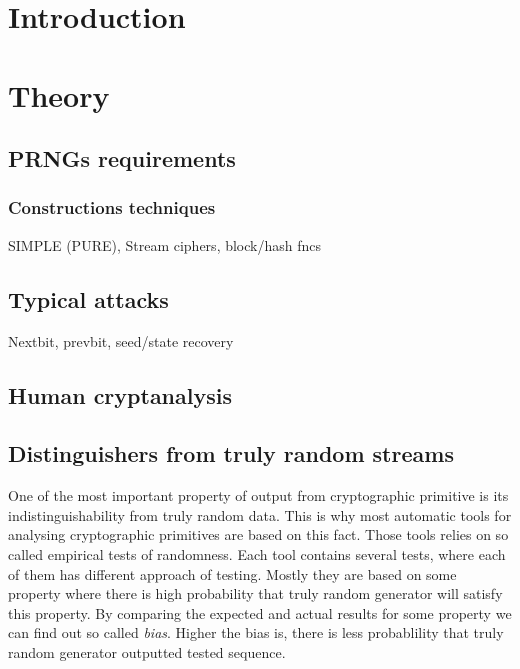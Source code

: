 \documentclass[
    digital,    %
    oneside,    %
    color,
    11pt,
    nocover,
    notable,
    nolof,
    nolot,
    final
]{fithesis3}
\begin{document}
\setlength{\parskip}{5pt}
\setlength{\parindent}{0pt}

\newtheorem{theorem}{Theorem}[section] %
\newtheorem{formula}[theorem]{Formula}     %

\chapter{Introduction}
\label{chap:introduction}


\chapter{Theory}

\section{PRNGs requirements}
\subsection{Constructions techniques}

SIMPLE (PURE), Stream ciphers, block/hash fncs

\section{Typical attacks}
Nextbit, prevbit, seed/state recovery

\section{Human cryptanalysis}
\cite{human-cryptanalysis}

\section{Distinguishers from truly random streams}

One of the most important property of output from cryptographic primitive is its indistinguishability from truly random data. This is why most automatic tools for analysing cryptographic primitives are based on this fact. Those tools relies on so called empirical tests of randomness. Each tool contains several tests, where each of them has different approach of testing. Mostly they are based on some property where there is high probability that truly random generator will satisfy this property. By comparing the expected and actual results for some property we can find out so called \textit{bias}. Higher the bias is, there is less probablility that truly random generator outputted tested sequence.
\end{document}
